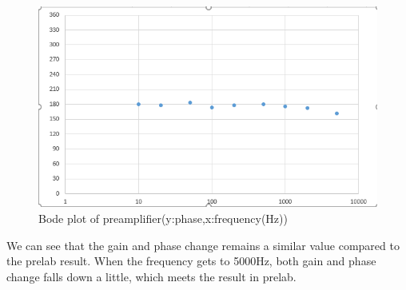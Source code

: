 \begin{figure}[!htbp]
	\centering 
	\begin{framed}
		\includegraphics[width=\linewidth]{images/1_2.PNG} 
		\caption{Bode plot of preamplifier(y:phase,x:frequency(Hz))}
		\label{fig:102} 
	\end{framed}
\end{figure}

\phantom{ } We can see that the gain and phase change remains a similar value compared to the prelab result. When the frequency gets to 5000Hz, both gain and phase change falls down a little, which meets the result in prelab.

